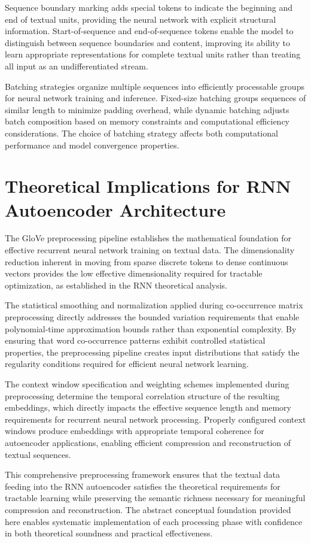 \documentclass[11pt,a4paper]{article}
\begin{document}
Sequence boundary marking adds special tokens to indicate the beginning and end of textual units, providing the neural network with explicit structural information. Start-of-sequence and end-of-sequence tokens enable the model to distinguish between sequence boundaries and content, improving its ability to learn appropriate representations for complete textual units rather than treating all input as an undifferentiated stream.

Batching strategies organize multiple sequences into efficiently processable groups for neural network training and inference. Fixed-size batching groups sequences of similar length to minimize padding overhead, while dynamic batching adjusts batch composition based on memory constraints and computational efficiency considerations. The choice of batching strategy affects both computational performance and model convergence properties.

\section{Theoretical Implications for RNN Autoencoder Architecture}

The GloVe preprocessing pipeline establishes the mathematical foundation for effective recurrent neural network training on textual data. The dimensionality reduction inherent in moving from sparse discrete tokens to dense continuous vectors provides the low effective dimensionality required for tractable optimization, as established in the RNN theoretical analysis.

The statistical smoothing and normalization applied during co-occurrence matrix preprocessing directly addresses the bounded variation requirements that enable polynomial-time approximation bounds rather than exponential complexity. By ensuring that word co-occurrence patterns exhibit controlled statistical properties, the preprocessing pipeline creates input distributions that satisfy the regularity conditions required for efficient neural network learning.

The context window specification and weighting schemes implemented during preprocessing determine the temporal correlation structure of the resulting embeddings, which directly impacts the effective sequence length and memory requirements for recurrent neural network processing. Properly configured context windows produce embeddings with appropriate temporal coherence for autoencoder applications, enabling efficient compression and reconstruction of textual sequences.

This comprehensive preprocessing framework ensures that the textual data feeding into the RNN autoencoder satisfies the theoretical requirements for tractable learning while preserving the semantic richness necessary for meaningful compression and reconstruction. The abstract conceptual foundation provided here enables systematic implementation of each processing phase with confidence in both theoretical soundness and practical effectiveness.
\end{document}
